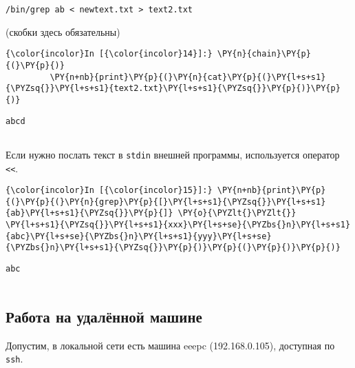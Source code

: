     \begin{Verbatim}[commandchars=\\\{\}]
/bin/grep ab < newtext.txt > text2.txt

    \end{Verbatim}

    (скобки здесь обязательны)

    \begin{Verbatim}[commandchars=\\\{\}]
{\color{incolor}In [{\color{incolor}14}]:} \PY{n}{chain}\PY{p}{(}\PY{p}{)}
         \PY{n+nb}{print}\PY{p}{(}\PY{n}{cat}\PY{p}{(}\PY{l+s+s1}{\PYZsq{}}\PY{l+s+s1}{text2.txt}\PY{l+s+s1}{\PYZsq{}}\PY{p}{)}\PY{p}{)}
\end{Verbatim}


    \begin{Verbatim}[commandchars=\\\{\}]
abcd


    \end{Verbatim}

    Если нужно послать текст в \texttt{stdin} внешней программы,
используется оператор \texttt{\textless{}\textless{}}.

    \begin{Verbatim}[commandchars=\\\{\}]
{\color{incolor}In [{\color{incolor}15}]:} \PY{n+nb}{print}\PY{p}{(}\PY{p}{(}\PY{n}{grep}\PY{p}{[}\PY{l+s+s1}{\PYZsq{}}\PY{l+s+s1}{ab}\PY{l+s+s1}{\PYZsq{}}\PY{p}{]} \PY{o}{\PYZlt{}\PYZlt{}} \PY{l+s+s1}{\PYZsq{}}\PY{l+s+s1}{xxx}\PY{l+s+se}{\PYZbs{}n}\PY{l+s+s1}{abc}\PY{l+s+se}{\PYZbs{}n}\PY{l+s+s1}{yyy}\PY{l+s+se}{\PYZbs{}n}\PY{l+s+s1}{\PYZsq{}}\PY{p}{)}\PY{p}{(}\PY{p}{)}\PY{p}{)}
\end{Verbatim}


    \begin{Verbatim}[commandchars=\\\{\}]
abc


    \end{Verbatim}

    \subsection{Работа на удалённой
машине}\label{ux440ux430ux431ux43eux442ux430-ux43dux430-ux443ux434ux430ux43bux451ux43dux43dux43eux439-ux43cux430ux448ux438ux43dux435}

Допустим, в локальной сети есть машина eeepc (192.168.0.105), доступная
по \texttt{ssh}.

